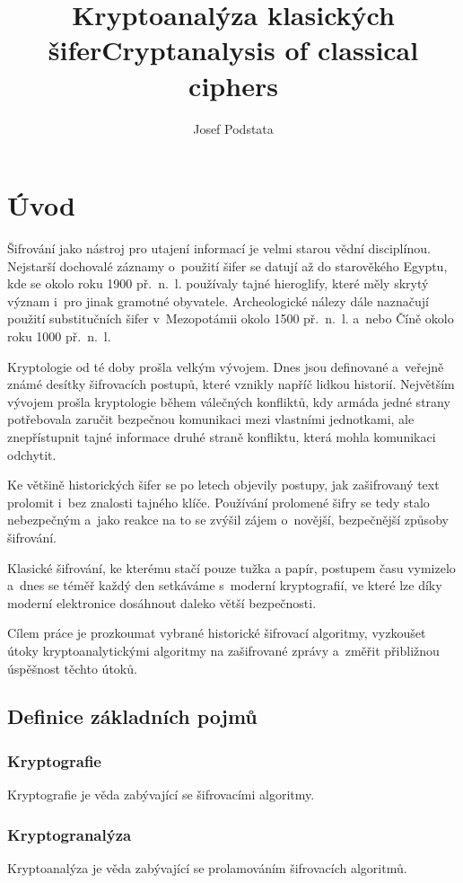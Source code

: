 \documentclass[glossaries, index]{kidiplom}
\title{Kryptoanalýza klasických šifer}
\title[english]{Cryptanalysis of classical ciphers}
\author{Josef Podstata}
\begin{document}
\maketitle


\section{Úvod}
\label{introduction-section}
Šifrování jako nástroj pro utajení informací je velmi starou vědní disciplínou.
Nejstarší dochovalé záznamy o~použití šifer se datují až do starověkého Egyptu, kde se okolo roku 1900 př.~n.~l. používaly tajné hieroglify, které měly skrytý význam i~pro jinak gramotné obyvatele. Archeologické nálezy dále naznačují použití substitučních šifer v~Mezopotámii okolo 1500 př.~n.~l. a~nebo Číně okolo roku 1000 př.~n.~l.

 Kryptologie od té doby prošla velkým vývojem. Dnes jsou definované a~veřejně známé desítky šifrovacích postupů, které vznikly napříč lidkou historií. Největším vývojem prošla kryptologie během válečných konfliktů, kdy armáda jedné strany potřebovala zaručit bezpečnou komunikaci mezi vlastními jednotkami, ale znepřístupnit tajné informace druhé straně konfliktu, která mohla komunikaci odchytit.

Ke většině historických šifer se po letech objevily postupy, jak zašifrovaný text prolomit i~bez znalosti tajného klíče. Používání prolomené šifry se tedy stalo nebezpečným a~jako reakce na to se zvýšil zájem o~novější, bezpečnější způsoby šifrování.

Klasické šifrování, ke kterému stačí pouze tužka a papír, postupem času vymizelo a~dnes se téměř každý den setkáváme s~moderní kryptografií, ve které lze díky moderní elektronice dosáhnout daleko větší bezpečnosti.

Cílem práce je prozkoumat vybrané historické šifrovací algoritmy, vyzkoušet útoky kryptoanalytickými algoritmy na zašifrované zprávy a~změřit přibližnou úspěšnost těchto útoků.

\subsection{Definice základních pojmů}
\subsubsection{Kryptografie}
Kryptografie je věda zabývající se šifrovacími algoritmy.

\subsubsection{Kryptogranalýza}
Kryptoanalýza je věda zabývající se prolamováním šifrovacích algoritmů.
\end{document}
